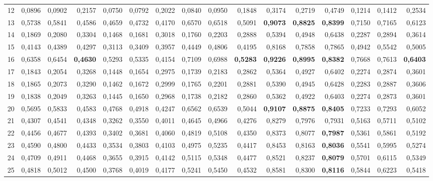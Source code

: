 \begin{table}[htp!]
\begin{adjustwidth}{-2cm}{}
\begin{tabular}{ l | *{15}{| r}}
12	&	0,0896	&	0,0902	&	0,2157	&	0,0750	&	0,0792	&	0,2022	&	0,0840	&	0,0950	&	0,1848	&	0,3174	&	0,2719	&	0,4749	&	0,1214	&	0,1412	&	0,2534	\\
13	&	0,5738	&	0,5841	&	0,4586	&	0,4659	&	0,4732	&	0,4170	&	0,6570	&	0,6518	&	0,5091	&	\textbf{0,9073}	&	\textbf{0,8825}	&	\textbf{0,8399}	&	0,7150	&	0,7165	&	0,6123	\\
14	&	0,1869	&	0,2080	&	0,3304	&	0,1468	&	0,1681	&	0,3018	&	0,1760	&	0,2203	&	0,2888	&	0,5394	&	0,4948	&	0,6438	&	0,2287	&	0,2894	&	0,3614	\\
15	&	0,4143	&	0,4389	&	0,4297	&	0,3113	&	0,3409	&	0,3957	&	0,4449	&	0,4806	&	0,4195	&	0,8168	&	0,7858	&	0,7865	&	0,4942	&	0,5542	&	0,5005	\\
16	&	0,6358	&	0,6454	&	\textbf{0,4630}	&	0,5293	&	0,5335	&	0,4154	&	0,7109	&	0,6988	&	\textbf{0,5283}	&	\textbf{0,9226}	&	\textbf{0,8995}	&	\textbf{0,8382}	&	0,7668	&	0,7613	&	\textbf{0,6403}	\\
17	&	0,1843	&	0,2054	&	0,3268	&	0,1448	&	0,1654	&	0,2975	&	0,1739	&	0,2183	&	0,2862	&	0,5364	&	0,4927	&	0,6402	&	0,2274	&	0,2874	&	0,3601	\\
18	&	0,1865	&	0,2073	&	0,3290	&	0,1462	&	0,1672	&	0,2999	&	0,1765	&	0,2201	&	0,2881	&	0,5390	&	0,4945	&	0,6428	&	0,2283	&	0,2887	&	0,3606	\\
19	&	0,1838	&	0,2049	&	0,3263	&	0,1445	&	0,1650	&	0,2968	&	0,1738	&	0,2182	&	0,2860	&	0,5362	&	0,4922	&	0,6403	&	0,2274	&	0,2873	&	0,3601	\\
20	&	0,5695	&	0,5833	&	0,4583	&	0,4768	&	0,4918	&	0,4247	&	0,6562	&	0,6539	&	0,5044	&	\textbf{0,9107}	&	\textbf{0,8875}	&	\textbf{0,8405}	&	0,7233	&	0,7293	&	0,6052	\\
21	&	0,4307	&	0,4541	&	0,4348	&	0,3262	&	0,3550	&	0,4011	&	0,4645	&	0,4966	&	0,4276	&	0,8279	&	0,7976	&	0,7931	&	0,5163	&	0,5711	&	0,5102	\\
22	&	0,4456	&	0,4677	&	0,4393	&	0,3402	&	0,3681	&	0,4060	&	0,4819	&	0,5108	&	0,4350	&	0,8373	&	0,8077	&	\textbf{0,7987}	&	0,5361	&	0,5861	&	0,5192	\\
23	&	0,4590	&	0,4800	&	0,4433	&	0,3534	&	0,3803	&	0,4103	&	0,4975	&	0,5235	&	0,4417	&	0,8453	&	0,8163	&	\textbf{0,8036}	&	0,5541	&	0,5995	&	0,5274	\\
24	&	0,4709	&	0,4911	&	0,4468	&	0,3655	&	0,3915	&	0,4142	&	0,5115	&	0,5348	&	0,4477	&	0,8521	&	0,8237	&	\textbf{0,8079}	&	0,5701	&	0,6115	&	0,5349	\\
25	&	0,4818	&	0,5012	&	0,4500	&	0,3768	&	0,4019	&	0,4177	&	0,5241	&	0,5450	&	0,4532	&	0,8581	&	0,8300	&	\textbf{0,8116}	&	0,5844	&	0,6223	&	0,5418	\\

\end{tabular}
\end{adjustwidth}
\end{table}
